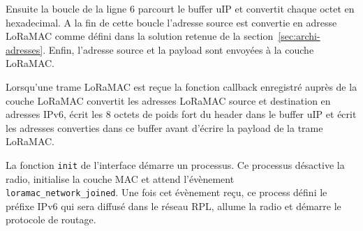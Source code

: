     Ensuite la boucle de la ligne 6 parcourt le buffer uIP et convertit chaque octet en hexadecimal.
    A la fin de cette boucle l'adresse source est convertie en adresse LoRaMAC comme défini dans la solution retenue de la section~\ref{sec:archi-adresses}. Enfin, l'adresse source et la payload sont envoyées à la couche LoRaMAC.

    Lorsqu'une trame LoRaMAC est reçue la fonction callback enregistré auprès de la couche LoRaMAC 
    convertit les adresses LoRaMAC source et destination en adresses IPv6, écrit les 8 
    octets de poids fort du header dans le buffer uIP et écrit les adresses converties dans ce buffer avant d'écrire la payload de la trame LoRaMAC.

    La fonction \texttt{init} de l'interface démarre un processus. Ce processus désactive la radio, 
    initialise la couche MAC et attend l'évènement\\ \texttt{loramac\_network\_joined}. Une fois cet 
    évènement reçu, ce process défini le préfixe IPv6 qui sera diffusé dans le réseau RPL, allume 
    la radio et démarre le protocole de routage.



